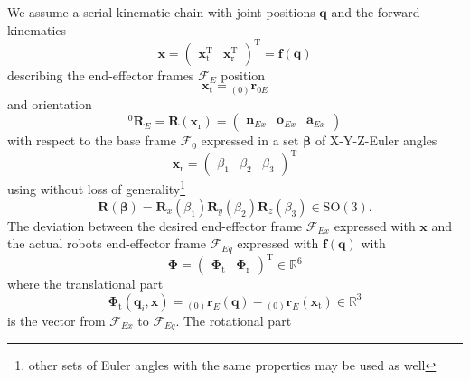 \documentclass[twocolumn,10pt]{IFTOMM}
\newcommand{\bm}[1]{\boldsymbol{#1}}
\newcommand{\ortvek}[4]{{ }_{(#1)}{\boldsymbol{#2}}^{#3}_{#4} }
\newcommand{\vek}[3]{\boldsymbol{#1}^{#2}_{#3}}
\newcommand{\rotmat}[2]{{{ }^{#1}\boldsymbol{R}}_{#2}}
\newcommand{\transp}[0]{{\mathrm{T}}}
\newcommand{\ks}[1]{{\mathcal{F}}_{#1}}
\begin{document}
We assume a serial kinematic chain with joint positions $\bm{q}$ and the forward kinematics
%
\begin{equation}
\bm{x}
=
\begin{pmatrix}
\bm{x}_{\mathrm{t}}^\transp & \bm{x}_{\mathrm{r}}^\transp
\end{pmatrix}^\transp
=
\bm{f} (\bm{q})
\end{equation}  
%
describing the end-effector frames $\ks{E}$ position 
%
\begin{equation}
\bm{x}_{\mathrm{t}}
=
\ortvek{0}{r}{}{0E}
\label{equ:xt_def}
\end{equation}  
%
and orientation 
%
\begin{equation}
\rotmat{0}{E}=\bm{R}(\bm{x}_{\mathrm{r}})
=
\begin{pmatrix}\vek{n}{}{Ex} & \vek{o}{}{Ex} & \vek{a}{}{Ex}\end{pmatrix}
\end{equation}  
% 
with respect to the base frame $\ks{0}$ expressed in a set $\bm{\beta}$ of X-Y-Z-Euler angles
%
\begin{equation}
\bm{x}_{\mathrm{r}}
=
\begin{pmatrix}
\beta_1  & \beta_2 & \beta_3
\end{pmatrix}^{\mathrm{T}}
\label{equ:xr_def}
\end{equation} 
%
using without loss of generality\footnote{other sets of Euler angles with the same properties may be used as well}
%
\begin{equation}
\bm{R}(\bm{\beta}) = \bm{R}_x(\beta_1) \bm{R}_y(\beta_2) \bm{R}_z(\beta_3) \in \mathrm{SO(3)}.
\label{equ:def_rmat_xyz}
\end{equation}
%
The deviation between the desired end-effector frame $\ks{Ex}$ expressed with $\bm{x}$ and the actual robots end-effector frame $\ks{Eq}$ expressed with $\bm{f}(\bm{q})$ with 
%
\begin{equation}
\bm{\Phi}=\begin{pmatrix}
\bm{\Phi}_{\mathrm{t}} & \bm{\Phi}_{\mathrm{r}}
\end{pmatrix}^\transp \in {\mathbb{R}}^{6}
\label{equ:Phi_def}
\end{equation}
%
where the translational part 
%
\begin{equation}
\bm{\Phi}_{\mathrm{t}}(\bm{q}_i,\bm{x}) = \ortvek{0}{r}{}{E}(\bm{q}) - \ortvek{0}{r}{}{E}(\bm{x}_{\mathrm{t}}) \in {\mathbb{R}}^{3}
\label{equ:Phit_def}
\end{equation}
%
is the vector from $\ks{Ex}$ to $\ks{Eq}$.
The rotational part
\end{document}

